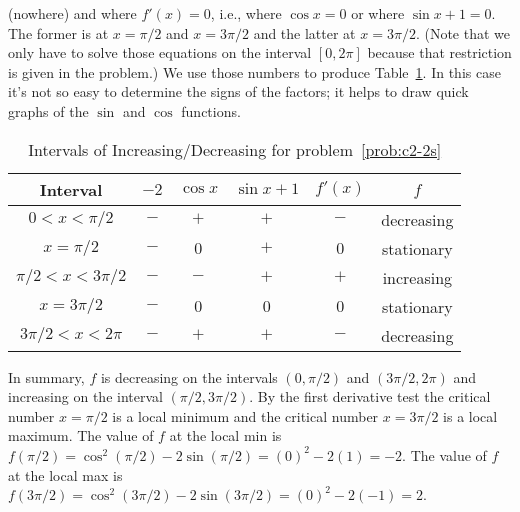 \documentclass{article}
\begin{document}
\begin{enumerate}
\begin{enumerate}
    (nowhere) and where $f'(x)=0$, i.e., where $\cos x=0$ or where
    $\sin x + 1=0$.  The former is at $x=\pi/2$ and $x=3\pi/2$ and the
    latter at $x=3\pi/2$.  (Note that we only have to solve those
    equations on the interval $[0,2\pi]$ because that restriction is
    given in the problem.)  We use those numbers to produce
    Table~\ref{tab:c2-2sfp}.  In this case it's not so easy to
    determine the signs of the factors; it helps to draw quick graphs
    of the $\sin$ and $\cos$ functions.
    \begin{table}[htbp]
      \centering
      \begin{tabular}{|c|c|c|c|c|c|}
        \hline
        Interval         & $-2$ & $\cos x$ & $\sin x+1$ & $f'(x)$ & $f$
        \\
        \hline\hline
        $0<x<\pi/2$      & $-$  & $+$      & $+$        & $-$     & decreasing
        \\
        \hline
        $x=\pi/2$        & $-$  & $0$      & $+$        & $0$     & stationary
        \\
        \hline
        $\pi/2<x<3\pi/2$ & $-$  & $-$      & $+$        & $+$     & increasing
        \\
        \hline
        $x=3\pi/2$       & $-$  & $0$      & $0$        & $0$     & stationary
        \\
        \hline
        $3\pi/2<x<2\pi$  & $-$  & $+$      & $+$        & $-$     & decreasing
        \\
        \hline
      \end{tabular}
      \caption{Intervals of Increasing/Decreasing for problem~\ref{prob:c2-2s}}
      \label{tab:c2-2sfp}
    \end{table}
    In summary, $f$ is decreasing on the intervals $(0,\pi/2)$ and
    $(3\pi/2,2\pi)$ and increasing on the interval $(\pi/2,3\pi/2)$.
    By the first derivative test the critical number $x=\pi/2$ is a
    local minimum and the critical number $x=3\pi/2$ is a local
    maximum.  The value of $f$ at the local min is
    $f(\pi/2)=\cos^2(\pi/2)-2\sin(\pi/2) = (0)^2-2(1)=-2$.  The value
    of $f$ at the local max is
    $f(3\pi/2)=\cos^2(3\pi/2)-2\sin(3\pi/2)=(0)^2-2(-1)=2$.


\end{enumerate}
\end{enumerate}
\end{document}
